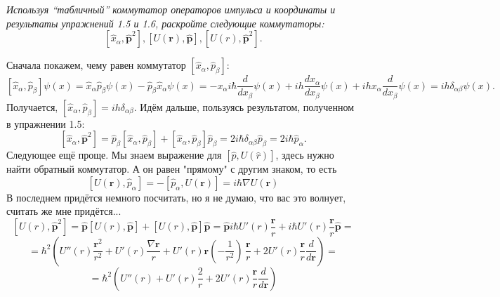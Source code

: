 \begin{center}
\textit{Используя ``табличный'' коммутатор операторов импульса и координаты и результаты упражнений 1.5 и 1.6, раскройте следующие коммутаторы:}
\[
[\hat x_{\alpha}, \hat{\mathbf{p}}^2], [U(\mathbf{r}), \hat{\mathbf{p}}], [U(r), \hat{\mathbf{p}}^2].
\]
\end{center}
Сначала покажем, чему равен коммутатор $[\hat{x}_{\alpha}, \hat{p}_{\beta}]$:
\[
[\hat{x}_{\alpha}, \hat{p}_{\beta}]\psi(x) = \hat{x}_{\alpha}\hat{p}_{\beta}\psi(x) - \hat{p}_{\beta}\hat{x}_{\alpha}\psi(x) = -x_{\alpha}i\hbar\frac{d}{dx_{\beta}}\psi(x) + ih\frac{dx_{\alpha}}{dx_{\beta}}\psi(x) + ihx_{\alpha}\frac{d}{dx_{\beta}}\psi(x) = ih\delta_{\alpha\beta}\psi(x).
\]
Получается, $[\hat{x}_{\alpha}, \hat{p}_{\beta}] = ih\delta_{\alpha\beta}$. Идём дальше, пользуясь результатом, полученном в упражнении 1.5:
\[
[\hat x_{\alpha}, \hat{\mathbf{p}}^2] = \hat{p}_{\beta}[\hat{x}_{\alpha}, \hat{p}_{\beta}] + [\hat{x}_{\alpha}, \hat{p}_{\beta}]\hat{p}_{\beta} = 2i\hbar\delta_{\alpha\beta}\hat{p}_{\beta} = 2i\hbar\hat p_{\alpha}.
\]
Следующее ещё проще. Мы знаем выражение для $[\hat p, U(\hat r)]$, здесь нужно найти обратный коммутатор. А он равен "прямому" с другим знаком, то есть
\[
[U(\mathbf{r}), \hat{p}_{\alpha}] = -[\hat{p}_\alpha, U(\mathbf{r})] = i\hbar \nabla U(\mathbf{r})
\]
В последнем придётся немного посчитать, но я не думаю, что вас это волнует, считать же мне придётся...
\[
[U(r), \hat{\mathbf{p}}^2] = \hat{\mathbf{p}}[U(r), \hat{\mathbf{p}}] + [U(r), \hat{\mathbf{p}}]\hat{\mathbf{p}} = \hat{\mathbf{p}}i\hbar U'(r)\frac{\mathbf{r}}{r} + i\hbar U'(r)\frac{\mathbf{r}}{r}\hat{\mathbf{p}} = 
\]
\[ = \hbar^2(U''(r)\frac{\mathbf{r}^2}{r^2} + U'(r) \frac{\nabla\mathbf{r}}{r} + U'(r)\mathbf{r}(-\frac{1}{r^2})\,\frac{\mathbf{r}}{r} + 2U'(r) \frac{\mathbf{r}}{r}\frac{d}{d\mathbf{r}}) =
\]
\[
=\hbar^2(U''(r) + U'(r) \frac{2}{r} + 2U'(r) \frac{\mathbf{r}}{r}\frac{d}{d\mathbf{r}})
\]

